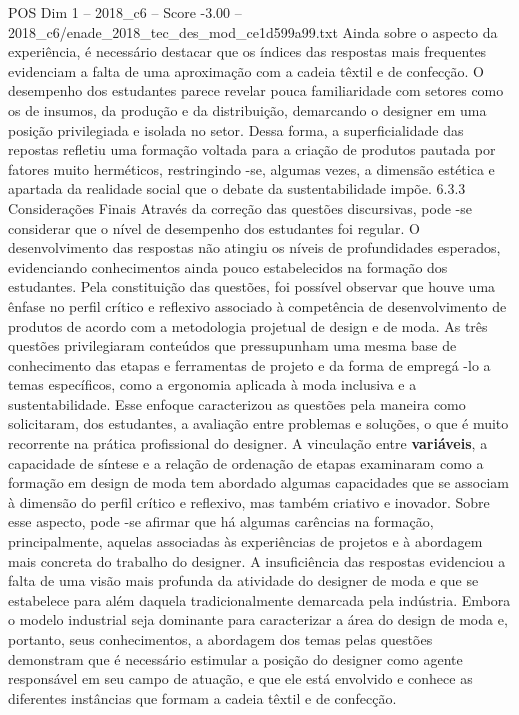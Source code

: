 \begin{textsample}{POS Dim 1 – 2018\_c6 – Score -3.00 – 2018\_c6/enade\_2018\_tec\_des\_mod\_ce1d599a99.txt}
Ainda sobre o aspecto da experiência, é necessário destacar que os índices das respostas mais frequentes evidenciam a falta de uma aproximação com a cadeia têxtil e de confecção.
O desempenho dos estudantes parece revelar pouca familiaridade com setores como os de insumos, da produção e da distribuição, demarcando o designer em uma posição privilegiada e isolada no setor.
Dessa forma, a superficialidade das repostas refletiu uma formação voltada para a criação de produtos pautada por fatores muito herméticos, restringindo -se, algumas vezes, a dimensão estética e apartada da realidade social que o debate da sustentabilidade impõe. 6.3.3 Considerações Finais Através da correção das questões discursivas, pode -se considerar que o nível de desempenho dos estudantes foi regular.
O desenvolvimento das respostas não atingiu os níveis de profundidades esperados, evidenciando conhecimentos ainda pouco estabelecidos na formação dos estudantes.
Pela constituição das questões, foi possível observar que houve uma ênfase no perfil crítico e reflexivo associado à competência de desenvolvimento de produtos de acordo com a metodologia projetual de design e de moda.
As três questões privilegiaram conteúdos que pressupunham uma mesma base de conhecimento das etapas e ferramentas de projeto e da forma de empregá -lo a temas específicos, como a ergonomia aplicada à moda inclusiva e a sustentabilidade.
Esse enfoque caracterizou as questões pela maneira como solicitaram, dos estudantes, a avaliação entre problemas e soluções, o que é muito recorrente na prática profissional do designer.
A vinculação entre \textbf{variáveis}, a capacidade de síntese e a relação de ordenação de etapas examinaram como a formação em design de moda tem abordado algumas capacidades que se associam à dimensão do perfil crítico e reflexivo, mas também criativo e inovador.
Sobre esse aspecto, pode -se afirmar que há algumas carências na formação, principalmente, aquelas associadas às experiências de projetos e à abordagem mais concreta do trabalho do designer.
A insuficiência das respostas evidenciou a falta de uma visão mais profunda da atividade do designer de moda e que se estabelece para além daquela tradicionalmente demarcada pela indústria.
Embora o modelo industrial seja dominante para caracterizar a área do design de moda e, portanto, seus conhecimentos, a abordagem dos temas pelas questões demonstram que é necessário estimular a posição do designer como agente responsável em seu campo de atuação, e que ele está envolvido e conhece as diferentes instâncias que formam a cadeia têxtil e de confecção.

\end{textsample}
